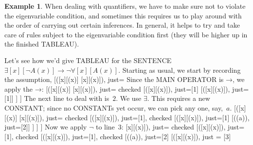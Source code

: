 \documentclass[10pt,a4paper]{article}
\newcommand*{\olup}[1]{\MakeUppercase{#1}}
\theoremstyle{plain}
\theoremstyle{definition}
\newtheorem{ex}[thm]{Example}
\theoremstyle{remark}
\newenvironment{oltableau}{}{}
\providecommand{\lif}{\mathbin{\rightarrow}}
\providecommand{\lforall}{\mathord{\forall}}
\providecommand{\lexists}{\mathord{\exists}}
\providecommand{\sFmla}[2]{#1(#2)}
\providecommand{\formula}{\relax}
\providecommand{\True}{\top}
\providecommand{\False}{\bot}
\providecommand{\TAss}[1]{}
\providecommand{\TRule}[1]{}
\providecommand{\formula}[1]{#1}
\begin{document}
\begin{ex}
When dealing with quantifiers, we have to make sure not to violate the
eigenvariable condition, and sometimes this requires us to play around
with the order of carrying out certain inferences. In general, it
helps to try and take care of rules subject to the eigenvariable
condition first (they will be higher up in the finished \olup{tableau}).

Let's see how we'd give \olup{tableau} for the \olup{sentence}
$\lexists[x][\lnot A(x)] \lif \lnot \lforall[x][A(x)]$.
Starting as usual, we start by recording the assumption,
\begin{oltableau}
[\sFmla{\False}{\lexists[x][\lnot \formula{A}(x)]\lif \lnot
    \lforall[x][\formula{A}(x)]}, just=\TAss]
\end{oltableau}
Since the \olup{main operator} is $\lif$, we apply the
$\TRule{\False}{\lif}$:
\begin{oltableau}
[\sFmla{\False}{\lexists[x][\lnot \formula{A}(x)]\lif \lnot
    \lforall[x][\formula{A}(x)]}, just=\TAss, checked
  [\sFmla{\True}{\lexists[x][\lnot \formula{A}(x)]},
    just={\TRule{\False}{\lif}[1]}
    [\sFmla{\False}{\lnot\lforall[x][\formula{A}(x)]},
      just={\TRule{\False}{\lif}[1]}]
  ]
]
\end{oltableau}
The next line to deal with is~$2$. We use
$\TRule{\True}{\lexists}$. This requires a new \olup{constant}; since no
\olup{constant}s yet occur, we can pick any one, say,~$a$.
\begin{oltableau}
[\sFmla{\False}{\lexists[x][\lnot \formula{A}(x)]\lif \lnot
    \lforall[x][\formula{A}(x)]}, just=\TAss, checked
  [\sFmla{\True}{\lexists[x][\lnot \formula{A}(x)]},
    just={\TRule{\False}{\lif}[1]}, checked
    [\sFmla{\False}{\lnot\lforall[x][\formula{A}(x)]},
      just={\TRule{\False}{\lif}[1]}
      [\sFmla{\True}{\lnot\formula{A}(a)}, just={\TRule{\True}{\lexists}[2]}]
    ]
  ]
]
\end{oltableau}
Now we apply $\TRule{\False}{\lnot}$ to line~$3$:
\begin{oltableau}
[\sFmla{\False}{\lexists[x][\lnot \formula{A}(x)]\lif \lnot
    \lforall[x][\formula{A}(x)]}, just=\TAss, checked
  [\sFmla{\True}{\lexists[x][\lnot \formula{A}(x)]},
    just={\TRule{\False}{\lif}[1]}, checked
    [\sFmla{\False}{\lnot\lforall[x][\formula{A}(x)]},
      just={\TRule{\False}{\lif}[1]}, checked
      [\sFmla{\True}{\lnot\formula{A}(a)}, just={\TRule{\True}{\lexists}[2]}
        [\sFmla{\True}{\lforall[x][\formula{A}(x)]},
          just = {\TRule{\False}{\lnot}[3]}

\end{oltableau}
\end{ex}
\end{document}
